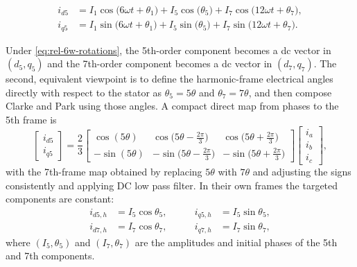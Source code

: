 \begin{align}
i_{d\text{5}}
  &= I_1 \cos\!\big(6\omega t + \theta_1\big)
   + I_5 \cos\!\big(\theta_5\big)
   + I_7 \cos\!\big(12\omega t + \theta_7\big),\\
i_{q\text{5}}
  &= I_1 \sin\!\big(6\omega t + \theta_1\big)
   + I_5 \sin\!\big(\theta_5\big)
   + I_7 \sin\!\big(12\omega t + \theta_7\big).
\end{align}

Under \eqref{eq:rel-6w-rotations}, the 5th-order component becomes a dc vector in $(d_5,q_5)$ and the 7th-order component becomes a dc vector in $(d_7,q_7)$. The second, equivalent viewpoint is to define the harmonic-frame electrical angles directly with respect to the stator as $\theta_5=5\theta$ and $\theta_7=7\theta$, and then compose Clarke and Park using those angles. A compact direct map from phases to the 5th frame is
\begin{equation}
\begin{bmatrix}
i_{d5}\\[2pt] i_{q5}
\end{bmatrix}
= \frac{2}{3}
\begin{bmatrix}
\cos(5\theta) & \cos\!\big(5\theta-\tfrac{2\pi}{3}\big) & \cos\!\big(5\theta+\tfrac{2\pi}{3}\big)\\[3pt]
-\sin(5\theta) & -\sin\!\big(5\theta-\tfrac{2\pi}{3}\big) & -\sin\!\big(5\theta+\tfrac{2\pi}{3}\big)
\end{bmatrix}
\begin{bmatrix} i_a\\[2pt] i_b\\[2pt] i_c \end{bmatrix},
\label{eq:abc-d5q5}
\end{equation}
with the 7th-frame map obtained by replacing $5\theta$ with $7\theta$ and adjusting the signs consistently and applying DC low pass filter. In their own frames the targeted components are constant:
\begin{equation}
\boxed{
\begin{aligned}
i_{d5,h} &= I_5\cos\theta_5,\qquad &i_{q5,h} &= I_5\sin\theta_5,\\
i_{d7,h} &= I_7\cos\theta_7,\qquad &i_{q7,h} &= I_7\sin\theta_7,
\end{aligned}}
\label{eq:dc-in-harmonic-frames}
\end{equation}
where $(I_5,\theta_5)$ and $(I_7,\theta_7)$ are the amplitudes and initial phases of the 5th and 7th components.

